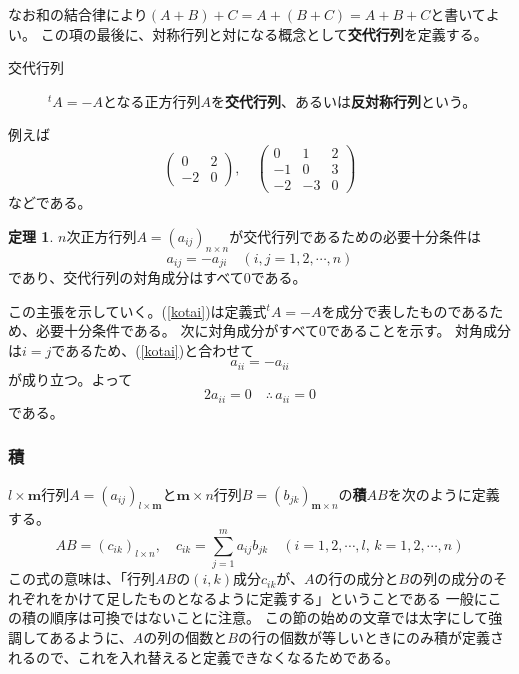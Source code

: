 \documentclass[10pt]{jsreport}
\theoremstyle{definition}%
\newtheorem{thm}{定理}[section]%
\numberwithin{equation}{section}%
\begin{document}
なお和の結合律により$(A+B)+C=A+(B+C)=A+B+C$と書いてよい。
この項の最後に、対称行列と対になる概念として{\bf 交代行列}を定義する。
\begin{framed}
\begin{description}
  \item[交代行列] ${}^{t}A=-A$となる正方行列$A$を{\bf 交代行列}、あるいは{\bf 反対称行列}という。
\end{description}
\end{framed}
例えば
\begin{equation}
  \left(  
      \begin{matrix}
        0 & 2  \\
        -2 & 0
      \end{matrix}
    \right), \quad \left(  
      \begin{matrix}
        0 & 1 & 2\\
        -1 & 0 & 3\\
        -2& -3 & 0 
      \end{matrix}
    \right)
\end{equation}
などである。
\begin{screen}
  \begin{thm}
    $n$次正方行列$A=(a_{ij})_{n\times n}$が交代行列であるための必要十分条件は
    \begin{equation}
  \label{kotai}    a_{ij}=-a_{ji} \quad (i,j=1,2,\cdots ,n)
    \end{equation}
    であり、交代行列の対角成分はすべて0である。
  \end{thm}
\end{screen}
この主張を示していく。(\ref{kotai})は定義式${}^{t}A=-A$を成分で表したものであるため、必要十分条件である。
次に対角成分がすべて0であることを示す。
対角成分は$i=j$であるため、(\ref{kotai})と合わせて
\begin{equation}
  a_{ii}=-a_{ii}
\end{equation}
が成り立つ。よって
\begin{equation}
  2a_{ii}=0  \quad  \therefore \, a_{ii}=0
\end{equation}
である。
\subsubsection{積}
$l\times \bm{m}$行列$A=(a_{ij})_{l\times \bm{m}}$と$\bm{m}\times n$行列$B=(b_{jk})_{\bm{m}\times n}$の{\bf 積}$AB$を次のように定義する。
\begin{equation}
  AB=(c_{ik})_{l\times n},\quad c_{ik}=\sum_{j=1}^{m} a_{ij}b_{jk}\quad (i=1,2,\cdots ,l,\, k=1,2,\cdots , n)
\end{equation}
この式の意味は、「行列$AB$の$(i,k)$成分$c_{ik}$が、$A$の行の成分と$B$の列の成分のそれぞれをかけて足したものとなるように定義する」ということである
一般にこの積の順序は可換ではないことに注意。
この節の始めの文章では太字にして強調してあるように、$A$の列の個数と$B$の行の個数が等しいときにのみ積が定義されるので、これを入れ替えると定義できなくなるためである。
\end{document}
